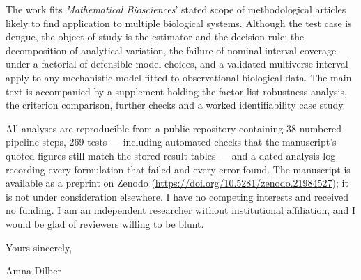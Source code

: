 \documentclass[11pt]{article}
\begin{document}
The work fits \emph{Mathematical Biosciences}' stated scope of methodological
articles likely to find application to multiple biological systems. Although the
test case is dengue, the object of study is the estimator and the decision rule:
the decomposition of analytical variation, the failure of nominal interval
coverage under a factorial of defensible model choices, and a validated
multiverse interval apply to any mechanistic model fitted to observational
biological data. The main text is accompanied by a supplement holding the
factor-list robustness analysis, the criterion comparison, further checks and a
worked identifiability case study.

All analyses are reproducible from a public repository containing 38 numbered
pipeline steps, 269 tests --- including automated checks that the manuscript's
quoted figures still match the stored result tables --- and a dated analysis
log recording every formulation that failed and every error found. The
manuscript is available as a preprint on Zenodo
(\url{https://doi.org/10.5281/zenodo.21984527}); it is not under consideration
elsewhere. I have no competing interests and received no funding. I am an
independent researcher without institutional affiliation, and I would be glad
of reviewers willing to be blunt.

Yours sincerely,

Amna Dilber
\end{document}
